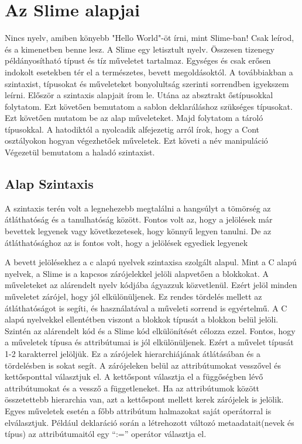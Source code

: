 \section{Az Slime alapjai}
Nincs nyelv, amiben könyebb "Hello World"-öt írni, mint Slime-ban!
Csak leírod, és a kimenetben benne lesz.
A Slime egy letisztult nyelv. 
Összesen tizenegy példányosítható típust és tíz műveletet tartalmaz. 
Egységes és csak erősen indokolt esetekben tér el a természetes, bevett megoldásoktól.
A továbbiakban a szintaxist, típusokat és műveleteket bonyolultság szerinti sorrendben igyekszem leírni.
Először a szintaxis alapjait írom le.
Utána az absztrakt őstípusokkal folytatom.
Ezt követően bemutatom a sablon deklaráláshoz szükséges típusokat.
Ezt követően mutatom be az alap műveleteket.
Majd folytatom a tároló típusokkal.
A hatodiktól a nyolcadik alfejezetig arról írok, hogy a Cont osztályokon hogyan végezhetőek műveletek.
Ezt követi a név manipuláció
Végezetül bemutatom a haladó szintaxist.

  

\subsection{Alap Szintaxis}
A szintaxis terén volt a legnehezebb megtalálni a hangsúlyt a tömörség az átláthatóság és a tanulhatóság között. 
Fontos volt az, hogy a jelölések már bevettek legyenek vagy következetesek, hogy könnyű legyen tanulni. 
De az átláthatósághoz az is fontos volt, hogy a jelölések egyediek legyenek

A bevett jelölésekhez a c alapú nyelvek szintaxisa szolgált alapul. 
Mint a C alapú nyelvek, a Slime is a kapcsos zárójelekkel jelöli alapvetően a blokkokat. 
A műveleteket az alárendelt nyelv kódjába ágyazzuk közvetlenül.
Ezért jelöl minden műveletet zárójel, hogy jól elkülönüljenek. 
Ez rendes tördelés mellett az átláthatóságot is segíti, és használatával a műveleti sorrend is egyértelmű. 
A C alapú nyelvekkel ellentétben viszont a blokkok típusát a blokkon belül jelöli. 
Szintén az alárendelt kód és a Slime kód elkülönítését célozza ezzel.
Fontos, hogy a műveletek típusa és attribútumai is jól elkülönüljenek.
Ezért a művelet típusát 1-2 karakterrel jelöljük.
Ez a zárójelek hierarchiájának átlátásában és a tördelésben is sokat segít. 
A zárójeleken belül az attribútumokat vesszővel és kettősponttal választjuk el. 
A kettőspont választja el a függőségben lévő attribútumokat és a vessző a függetleneket. 
Ha az attribútumok között összetettebb hierarchia van, azt a kettőspont mellett kerek zárójelek is jelölik. 
Egyes műveletek esetén a főbb attribútum halmazokat saját operátorral is elválasztjuk. 
Például deklaráció során a létrehozott változó metaadatait(nevek és típus) az attribútumaitól egy “:=” operátor választja el.

